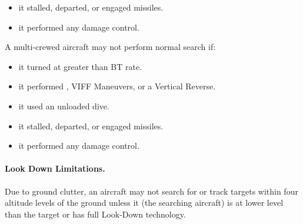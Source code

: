 {\begin{itemize}
    \item it stalled, departed, or engaged missiles.


    \item it performed any damage control.

    
\end{itemize}

A multi-crewed aircraft may not perform normal search if:

\begin{itemize}

    \item it turned at greater than BT rate.

    \item it performed , VIFF Maneuvers, or a Vertical Reverse.

    \item it used an unloaded dive.


    \item it stalled, departed, or engaged missiles.


    \item it performed any damage control.


\end{itemize}


\paragraph{Look Down Limitations.} \label{rule:radar-ground-clutter} Due to ground clutter, an aircraft may not search for or track targets within four altitude levels of the ground unless it (the searching aircraft) is at lower level than the target or has full Look-Down technology.

}
